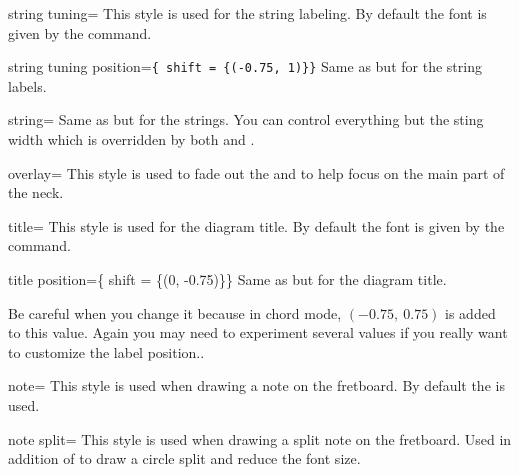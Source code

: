 \documentclass[a4paper]{article}
\begin{document}
\begin{docKey}[tikz][]{string tuning}{=}{}
  This style is used for the string labeling. By default the font is given
  by the  command.
\end{docKey}

\begin{docKey}[tikz][]{string tuning position}{=}{\texttt{\{ shift = \{(-0.75, 1)\}\}}}
  Same as  but for the string labels.
\end{docKey}

\begin{docKey}[tikz][]{string}{=}{}
  Same as  but for the strings. You can control
  everything but the sting width which is overridden by both
   and .
\end{docKey}

\begin{docKey}[tikz][]{overlay}{=}{}
  This style is used to fade out the  and
   to help focus on the main part of the neck.
\end{docKey}

\begin{docKey}[tikz][]{title}{=}{}
  This style is used for the diagram title. By default the font is given
  by the  command.
\end{docKey}

\begin{docKey}[tikz][]{title position}{=}{\{ shift = \{(0, -0.75)\}\}}
  Same as  but for the diagram title.

  Be careful when you change it because in chord mode, $(-0.75,~0.75)$ is
  added to this value. Again you may need to experiment several values if
  you really want to customize the label position..
\end{docKey}

\begin{docKey}[tikz][]{note}{=}{}
  This style is used when drawing a note on the fretboard. By default the
   is used.
\end{docKey}

\begin{docKey}[tikz][]{note split}{=}{}
  This style is used when drawing a split note on the fretboard. Used in
  addition of  to draw a circle split and reduce the font
  size.
\end{docKey}
\end{document}

